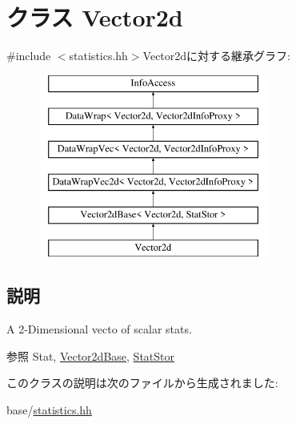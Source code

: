 \hypertarget{classStats_1_1Vector2d}{
\section{クラス Vector2d}
\label{classStats_1_1Vector2d}
}


{\ttfamily \#include $<$statistics.hh$>$}Vector2dに対する継承グラフ:\begin{figure}[H]
\begin{center}
\leavevmode
\includegraphics[height=6cm]{classStats_1_1Vector2d}
\end{center}
\end{figure}


\subsection{説明}
A 2-\/Dimensional vecto of scalar stats. \begin{DoxySeeAlso}{参照}
Stat, \hyperlink{classStats_1_1Vector2dBase}{Vector2dBase}, \hyperlink{classStats_1_1StatStor}{StatStor} 
\end{DoxySeeAlso}


このクラスの説明は次のファイルから生成されました:\begin{DoxyCompactItemize}
\item 
base/\hyperlink{statistics_8hh}{statistics.hh}\end{DoxyCompactItemize}
